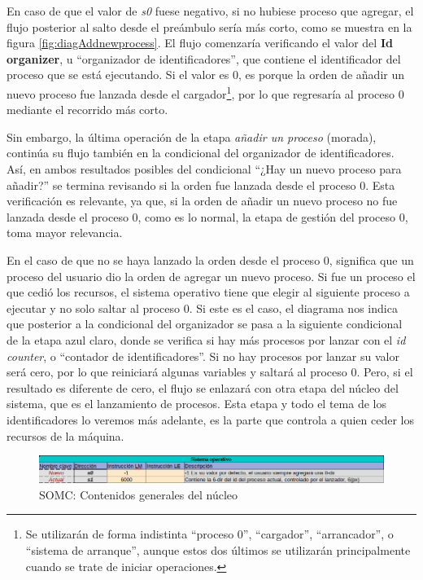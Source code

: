 \documentclass[letterpaper,12pt,oneside]{book}
\begin{document}
			En caso de que el valor de \textit{s0} fuese negativo, si no hubiese proceso que agregar, 
			el flujo posterior al salto desde el preámbulo sería más corto,
			como se muestra en la figura \ref{fig:diagAddnewprocess}. El flujo comenzaría verificando el 
			valor del \textbf{Id organizer}, u ``organizador de identificadores'', que contiene el identificador del proceso que se está ejecutando. Si 
			el 
			valor es 0, es porque 
            la orden de añadir un nuevo proceso fue lanzada desde el cargador\footnote{Se utilizarán de forma indistinta ``proceso 0'', ``cargador'', 
            ``arrancador'', o 
            ``sistema de arranque'', aunque estos dos últimos se utilizarán principalmente cuando se trate de iniciar operaciones.}, por lo que regresaría 
            al proceso 0 mediante el recorrido más corto.
  
       
            Sin embargo, la última operación de la etapa \textit{añadir un proceso} (morada), continúa su flujo también en la condicional
            del organizador de identificadores. Así, en ambos resultados posibles del condicional ``¿Hay un nuevo proceso para añadir?'' 
			se termina revisando si la orden fue 
			lanzada desde el proceso 0. Esta verificación es relevante, ya que, si la orden de añadir un nuevo proceso no fue lanzada desde el proceso 
			0, como es lo normal, la etapa de gestión del proceso 0, toma mayor relevancia. 
			
			En el caso de 
			que no se haya lanzado la 
			orden
			desde el proceso 0, significa que un proceso del usuario dio la orden
   			de agregar un nuevo proceso. Si fue un proceso el que cedió los recursos, el sistema operativo tiene que elegir al siguiente 
   			proceso a ejecutar y no solo saltar al proceso 0. Si este es el caso, el diagrama nos indica que posterior
   			a la condicional del organizador se pasa a la siguiente
   			condicional de la etapa azul claro, donde se verifica si hay más procesos por lanzar con el \textit{id counter}, o ``contador
   			de identificadores''. Si no hay procesos por lanzar su valor será cero, por lo que reiniciará algunas variables  y saltará al proceso 0.
   			Pero,
   			si el resultado es diferente de cero, el flujo se enlazará con otra etapa del núcleo del sistema, que es el lanzamiento de procesos. Esta 
   			etapa y todo el tema de los identificadores lo veremos
			más adelante, es la parte que controla a quien ceder los recursos de la máquina.

			 \begin{figure}[H]		
				\centering
				\includegraphics[scale=0.55]{media/CARDIACC/SOMCGeneralNucleo.png}
				\caption{SOMC: Contenidos generales del núcleo}
				\label{fig:somcGeneralnucleo}
			\end{figure}
  
\end{document}
